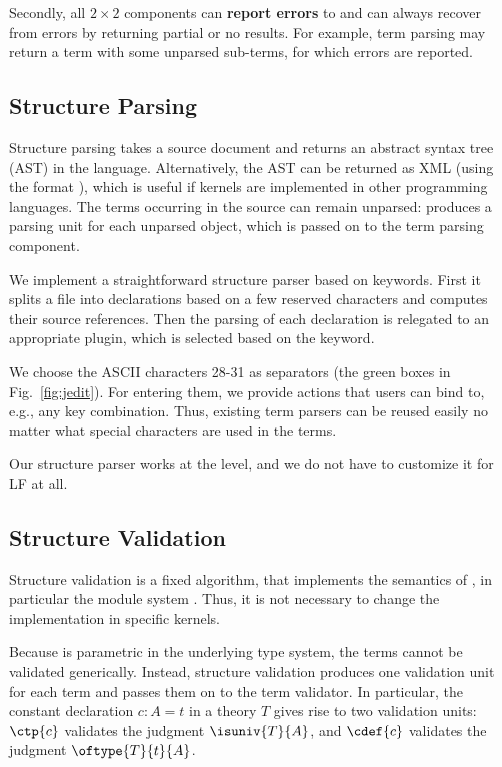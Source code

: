 Secondly, all $2\times 2$ components can \textbf{report errors} to \jmmt and can always recover from errors by returning partial or no results.
For example, term parsing may return a term with some unparsed sub-terms, for which errors are reported.

\subsection{Structure Parsing}\label{sec:sp}

Structure parsing takes a source document and returns an abstract syntax tree (AST) in the \mmt language.
Alternatively, the AST can be returned as XML (using the \omdoc format \cite{omdoc}), which is useful if kernels are implemented in other programming languages.
The terms occurring in the source can remain unparsed: \jmmt produces a parsing unit for each unparsed object, which is passed on to the term parsing component.

\begin{example}
We implement a straightforward structure parser based on keywords.
First it splits a file into declarations based on a few reserved characters and computes their source references.
Then the parsing of each declaration is relegated to an appropriate plugin, which is selected based on the keyword.

We choose the ASCII characters 28-31 as separators (the green boxes in Fig.~\ref{fig:jedit}).
For entering them, we provide \jedit actions that users can bind to, e.g., any key combination.
Thus, existing term parsers can be reused easily no matter what special characters are used in the terms.

Our structure parser works at the \mmt level, and we do not have to customize it for LF at all.
\end{example}

\subsection{Structure Validation}\label{sec:sv}

Structure validation is a fixed algorithm, that implements the semantics of \mmt, in particular the module system \cite{RK:mmt:10}.
Thus, it is not necessary to change the implementation in specific kernels.

Because \mmt is parametric in the underlying type system, the terms cannot be validated generically.
Instead, structure validation produces one validation unit for each term and passes them on to the term validator.
In particular, the constant declaration $c:A=t$ in a theory $T$ gives rise to two validation units:
$\ctp{c}$ validates the judgment $\isuniv{T}{A}$, and $\cdef{c}$ validates the judgment $\oftype{T}{t}{A}$.

